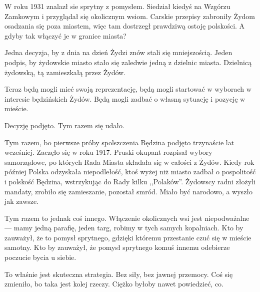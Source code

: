 \documentclass[11pt,a4paper,oneside]{article}
\begin{document}
W roku 1931 znalazł sie sprytny z pomysłem. Siedział kiedyś na Wzgórzu
Zamkowym i przyglądał się okolicznym wsiom. Carskie przepisy zabroniły
Żydom osadzania się poza miastem, więc tam dostrzegł prawdziwą ostoję
polskości. A gdyby tak włączyć je w granice miasta? 

Jedna decyzja, by z dnia na dzień Żydzi znów stali się mniejszością.
Jeden podpis, by żydowskie miasto stało się zaledwie jedną z dzielnic
miasta.  Dzielnicą żydowską, tą zamieszkałą przez Żydów. 

Teraz będą mogli mieć swoją reprezentację, będą mogli startować
w wyborach w interesie będzińskich Żydów. Będą mogli zadbać o własną
sytuację i pozycję w mieście. 

Decyzję podjęto. Tym razem się udało. 

Tym razem, bo pierwsze próby spolszczenia Będzina podjęto trzynaście 
lat wcześniej. Zaczęło się w roku 1917. Pruski okupant
rozpisał wybory samorządowe, po których Rada Miasta składała się
w całości z Żydów. Kiedy rok później Polska odzyskała niepodlełość,
ktoś wyżej niż miasto zadbał o pospolitość i polskość Będzina,
wstrzykując do Rady kilku ,,Polaków''. Żydowscy radni złożyli
mandaty, zrobiło się zamieszanie, pozostał smród. Miało być
narodowo, a wyszło jak zawsze.

Tym razem to jednak coś innego. Włączenie okolicznych wsi jest
niepodważalne --- mamy jedną parafię, jeden targ, robimy w  tych
samych kopalniach. Kto by zauważył, że to pomysł sprytnego, gdzięki
któremu przestanie czuć się w mieście samotny. Kto by zauważył, 
że pomysł sprytnego komuś innemu odebierze poczucie bycia u siebie. 

To właśnie jest skuteczna strategia. Bez siły, bez jawnej 
przemocy. Coś się zmieniło, bo taka jest kolej rzeczy. 
Ciężko byłoby nawet powiedzieć, co. 
\end{document}
